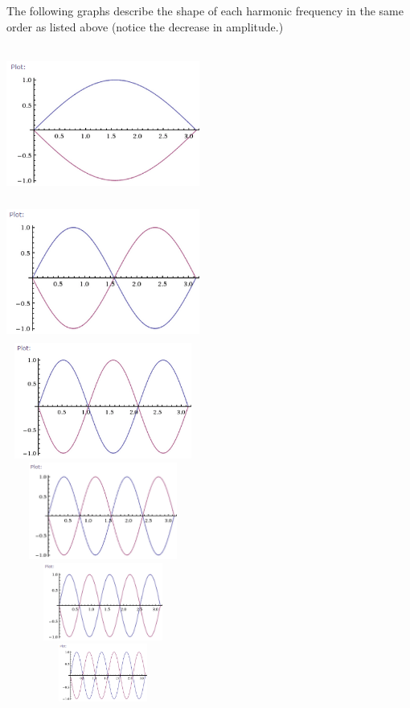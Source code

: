 \documentclass[a4paper,12pt]{article}
\begin{document}
The following graphs describe the shape of each harmonic frequency in
the same order as listed above (notice the decrease in amplitude.)
\begin{center}
    \includegraphics[width=2.5in, height=2in]{f1.PNG} \\
    \includegraphics[width=2.5in, height=1.75in]{f2.PNG} \\
    \includegraphics[width=2.5in, height=1.5in]{f3.PNG} \\
    \includegraphics[width=2.5in, height=1.25in]{f4.PNG} \\
    \includegraphics[width=2.5in, height=1in]{f5.PNG} \\
    \includegraphics[width=2.5in, height=0.75in]{f6.PNG} \\
\end{center}
\end{document}
